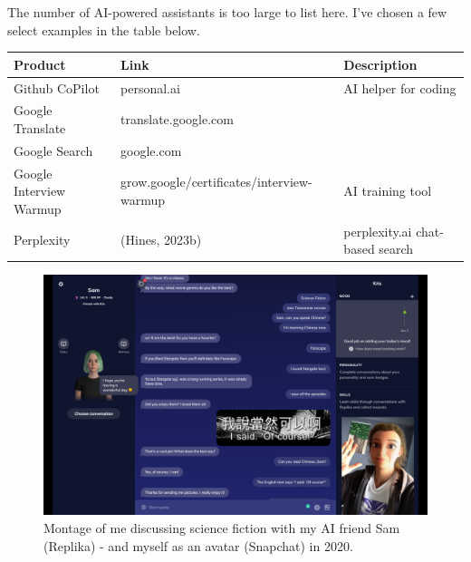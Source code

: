 \documentclass[
  letterpaper,
  DIV=11,
  numbers=noendperiod]{scrartcl}
\begin{document}
The number of AI-powered assistants is too large to list here. I've
chosen a few select examples in the table below.

\begin{longtable}[]{@{}
  >{\raggedright\arraybackslash}p{}
  >{\raggedright\arraybackslash}p{}
  >{\raggedright\arraybackslash}p{}@{}}
\toprule\noalign{}
\begin{minipage}[b]{\linewidth}\raggedright
Product
\end{minipage} & \begin{minipage}[b]{\linewidth}\raggedright
Link
\end{minipage} & \begin{minipage}[b]{\linewidth}\raggedright
Description
\end{minipage} \\
\midrule\noalign{}
\endhead
\bottomrule\noalign{}
\endlastfoot
Github CoPilot & personal.ai & AI helper for coding \\
Google Translate & translate.google.com & \\
Google Search & google.com & \\
Google Interview Warmup & grow.google/certificates/interview-warmup & AI
training tool \\
Perplexity & (Hines, 2023b) & perplexity.ai chat-based search \\
\end{longtable}

\begin{figure}[H]

{\centering \includegraphics[width=1\linewidth,height=\textheight,keepaspectratio]{./images/ai/with-me.png}

}

\caption{Montage of me discussing science fiction with my AI friend Sam
(Replika) - and myself as an avatar (Snapchat) in 2020.}

\end{figure}%
\end{document}

